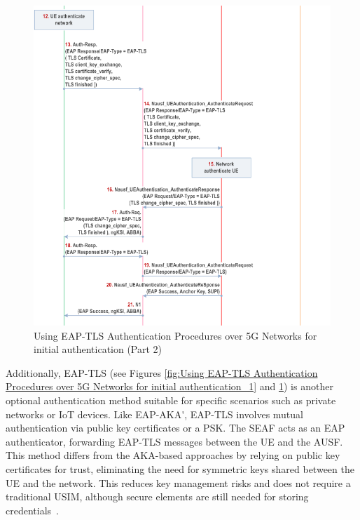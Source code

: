 \begin{figure}
    \centering
    \includegraphics[width=1\linewidth]{figs/Using EAP-TLS Authentication Procedures over 5G Networks for initial authentication_2.png}
    \caption{Using \acs{EAP-TLS} Authentication Procedures over \acs{5G} Networks for initial authentication (Part 2)}
    \label{fig:Using EAP-TLS Authentication Procedures over 5G Networks for initial authentication_2}
\end{figure}

Additionally, \ac{EAP-TLS} (see Figures \ref{fig:Using EAP-TLS Authentication Procedures over 5G Networks for initial authentication_1} and \ref{fig:Using EAP-TLS Authentication Procedures over 5G Networks for initial authentication_2}) is another optional authentication method suitable for specific scenarios such as private networks or \ac{IoT} devices. Like \ac{EAP-AKA'}, \ac{EAP-TLS} involves mutual authentication via public key certificates or a \ac{PSK}. The \ac{SEAF} acts as an \ac{EAP} authenticator, forwarding \ac{EAP-TLS} messages between the \ac{UE} and the \ac{AUSF}. This method differs from the \ac{AKA}-based approaches by relying on public key certificates for trust, eliminating the need for symmetric keys shared between the \ac{UE} and the network. This reduces key management risks and does not require a traditional \ac{USIM}, although secure elements are still needed for storing credentials~\cite{33.501-p232}.

